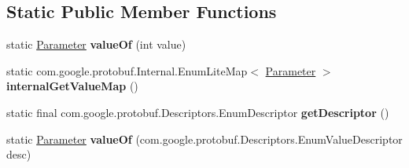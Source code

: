 \subsection*{Static Public Member Functions}
\begin{DoxyCompactItemize}
\item 
\mbox{\label{enumcom_1_1mysql_1_1cj_1_1x_1_1protobuf_1_1_mysqlx_notice_1_1_session_state_changed_1_1_parameter_ac6dfd09c95230c71377b22f505ef2017}} 
static \mbox{\hyperlink{enumcom_1_1mysql_1_1cj_1_1x_1_1protobuf_1_1_mysqlx_notice_1_1_session_state_changed_1_1_parameter}{Parameter}} {\bfseries value\+Of} (int value)
\item 
\mbox{\label{enumcom_1_1mysql_1_1cj_1_1x_1_1protobuf_1_1_mysqlx_notice_1_1_session_state_changed_1_1_parameter_ad48b19c2d5d0e57235097af47ed68941}} 
static com.\+google.\+protobuf.\+Internal.\+Enum\+Lite\+Map$<$ \mbox{\hyperlink{enumcom_1_1mysql_1_1cj_1_1x_1_1protobuf_1_1_mysqlx_notice_1_1_session_state_changed_1_1_parameter}{Parameter}} $>$ {\bfseries internal\+Get\+Value\+Map} ()
\item 
\mbox{\label{enumcom_1_1mysql_1_1cj_1_1x_1_1protobuf_1_1_mysqlx_notice_1_1_session_state_changed_1_1_parameter_a4b112d5d7eaef504d4b3349e2f4b4c81}} 
static final com.\+google.\+protobuf.\+Descriptors.\+Enum\+Descriptor {\bfseries get\+Descriptor} ()
\item 
\mbox{\label{enumcom_1_1mysql_1_1cj_1_1x_1_1protobuf_1_1_mysqlx_notice_1_1_session_state_changed_1_1_parameter_adfe85a99429acd684420766bdd607a84}} 
static \mbox{\hyperlink{enumcom_1_1mysql_1_1cj_1_1x_1_1protobuf_1_1_mysqlx_notice_1_1_session_state_changed_1_1_parameter}{Parameter}} {\bfseries value\+Of} (com.\+google.\+protobuf.\+Descriptors.\+Enum\+Value\+Descriptor desc)
\end{DoxyCompactItemize}
